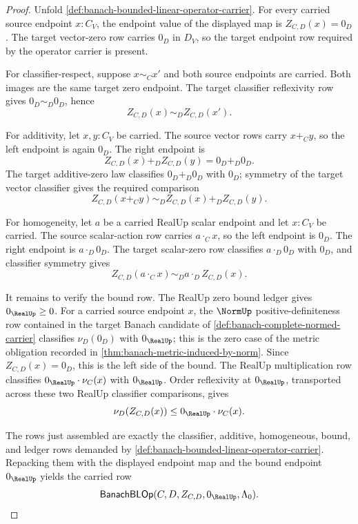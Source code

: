 \begin{proof}
Unfold \autoref{def:banach-bounded-linear-operator-carrier}. For every carried source endpoint $x:C_V$, the endpoint value of the displayed map is $Z_{C,D}(x)=0_D$. The target vector-zero row carries $0_D$ in $D_V$, so the target endpoint row required by the operator carrier is present.

For classifier-respect, suppose $x\sim_C x'$ and both source endpoints are carried. Both images are the same target zero endpoint. The target classifier reflexivity row gives $0_D\sim_D0_D$, hence
$$
Z_{C,D}(x)\sim_D Z_{C,D}(x').
$$

For additivity, let $x,y:C_V$ be carried. The source vector rows carry $x+_C y$, so the left endpoint is again $0_D$. The right endpoint is
$$
Z_{C,D}(x)+_D Z_{C,D}(y)=0_D+_D0_D.
$$
The target additive-zero law classifies $0_D+_D0_D$ with $0_D$; symmetry of the target vector classifier gives the required comparison
$$
Z_{C,D}(x+_C y)\sim_D Z_{C,D}(x)+_D Z_{C,D}(y).
$$

For homogeneity, let $a$ be a carried RealUp scalar endpoint and let $x:C_V$ be carried. The source scalar-action row carries $a\cdot_C x$, so the left endpoint is $0_D$. The right endpoint is $a\cdot_D0_D$. The target scalar-zero row classifies $a\cdot_D0_D$ with $0_D$, and classifier symmetry gives
$$
Z_{C,D}(a\cdot_C x)\sim_D a\cdot_DZ_{C,D}(x).
$$

It remains to verify the bound row. The RealUp zero bound ledger gives $0_{\RealUp}\ge0$. For a carried source endpoint $x$, the $\NormUp$ positive-definiteness row contained in the target Banach candidate of \autoref{def:banach-complete-normed-carrier} classifies $\nu_D(0_D)$ with $0_{\RealUp}$; this is the zero case of the metric obligation recorded in \autoref{thm:banach-metric-induced-by-norm}. Since $Z_{C,D}(x)=0_D$, this is the left side of the bound. The RealUp multiplication row classifies $0_{\RealUp}\cdot\nu_C(x)$ with $0_{\RealUp}$. Order reflexivity at $0_{\RealUp}$, transported across these two RealUp classifier comparisons, gives
$$
\nu_D(Z_{C,D}(x))\le 0_{\RealUp}\cdot\nu_C(x).
$$

The rows just assembled are exactly the classifier, additive, homogeneous, bound, and ledger rows demanded by \autoref{def:banach-bounded-linear-operator-carrier}. Repacking them with the displayed endpoint map and the bound endpoint $0_{\RealUp}$ yields the carried row
$$
\mathsf{BanachBLOp}(C,D,Z_{C,D},0_{\RealUp},\Lambda_0).
$$
\end{proof}

